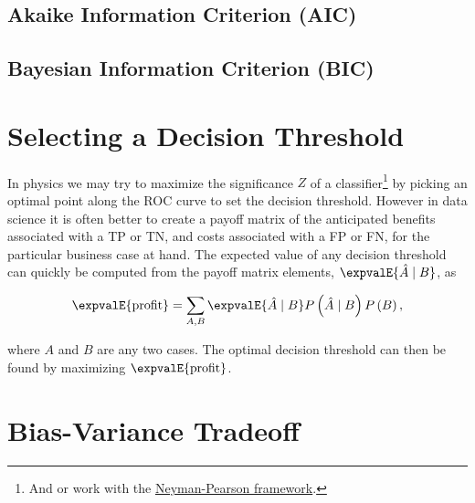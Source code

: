 \subsection{Akaike Information Criterion (AIC)}
\label{ml_general:eval:AIC}

\subsection{Bayesian Information Criterion (BIC)}
\label{ml_general:eval:BIC}

\section{Selecting a Decision Threshold}
\label{ml_general:decision_threshold}


In physics we may try to maximize the significance $Z$ of a classifier\footnote{And or
work with the \href{https://en.wikipedia.org/wiki/Neyman\%E2\%80\%93Pearson\_lemma}{Neyman-Pearson framework}.} by
picking an optimal point along the ROC curve to set the decision threshold.
However in data science it is often better to create a payoff matrix of the anticipated
benefits associated with a TP or TN, and costs associated with a FP or FN,
for the particular business case at hand.
The expected value of any decision threshold can quickly be computed
from the payoff matrix elements, $\expvalE{\hat{A} \mid B}$, as

\begin{equation} \label{eq:E_profit}
\expvalE{\text{profit}} = \sum_{A,B} \expvalE{\hat{A} \mid B} P\left(\hat{A} \mid B \right) P\left(B\right),
\end{equation}

\noindent where $A$ and $B$ are any two cases.
The optimal decision threshold can then be found by maximizing $\expvalE{\text{profit}}$.

\section{Bias-Variance Tradeoff}
\label{ml_general:bias_variance_tradeoff}

